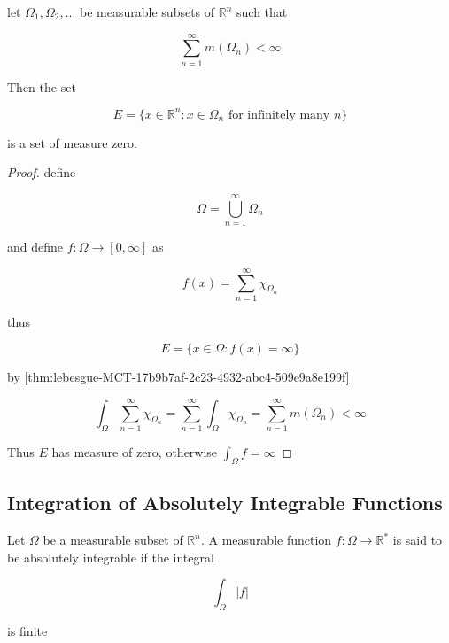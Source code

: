\begin{thm}
    let $\Omega_1,\Omega_2, ...$ be measurable subsets of $\mathbb{R}^n$ such that 

    \[
        \sum_{n=1}^{\infty}m(\Omega_n) < \infty
    \]

    Then the set

    \[
        E = \{ x \in \mathbb{R}^n: x \in \Omega_n \text{ for infinitely many } n \}
    \]

    is a set of measure zero.
\end{thm}

\begin{proof}
    define 

    \[
        \Omega = \bigcup_{n=1}^{\infty}\Omega_n
    \]

    and define $f: \Omega \to [0, \infty]$ as

    \[
        f(x) = \sum_{n=1}^{\infty}\chi_{\Omega_n}
    \]

    thus 

    \[
        E = \{x \in \Omega: f(x) = \infty \}
    \]

    by \autoref{thm:lebesgue-MCT-17b9b7af-2c23-4932-abc4-509e9a8e199f}

    \[
        \int_{\Omega}\sum_{n=1}^{\infty}\chi_{\Omega_n} = \sum_{n=1}^{\infty}\int_{\Omega}\chi_{\Omega_n} = \sum_{n=1}^{\infty} m(\Omega_n) < \infty
    \]

    Thus $E$ has measure of zero, otherwise $\int_{\Omega} f = \infty$
\end{proof}

\subsection{Integration of Absolutely Integrable Functions}

\begin{definition}
    Let $\Omega$ be a measurable subset of $\mathbb{R}^n$. 
    A measurable function $f: \Omega \to \mathbb{R}^*$ is said  
    to be absolutely integrable if the  integral

    \[
        \int_{\Omega} |f| 
    \]

    is finite
\end{definition}

